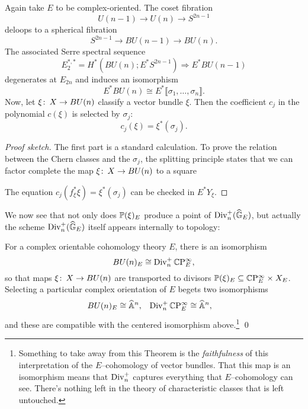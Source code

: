 \begin{theorem}
Again take $E$ to be complex-oriented.  The coset fibration \[U(n-1) \to U(n) \to S^{2n-1}\] deloops to a spherical fibration \[S^{2n-1} \to BU(n-1) \to BU(n).\]  The associated Serre spectral sequence \[E_2^{*, *} = H^*(BU(n); E^* S^{2n-1}) \Rightarrow E^* BU(n-1)\] degenerates at $E_{2n}$ and induces an isomorphism \[E^* BU(n) \cong E^* \llbracket \sigma_1, \ldots, \sigma_n\rrbracket.\]  Now, let $\xi\co X \to BU(n)$ classify a vector bundle $\xi$.  Then the coefficient $c_j$ in the polynomial $c(\xi)$ is selected by $\sigma_j$: \[c_j(\xi) = \xi^*(\sigma_j).\]
\end{theorem}
\begin{proof}[Proof sketch]
The first part is a standard calculation.  To prove the relation between the Chern classes and the $\sigma_j$, the splitting principle states that we can factor complete the map $\xi\co X \to BU(n)$ to a square
\begin{center}
\end{center}
The equation $c_j(f_\xi^* \xi) = \xi^*(\sigma_j)$ can be checked in $E^* Y_\xi$.
\end{proof}

We now see that not only does $\P(\xi)_E$ produce a point of $\Div_n^+(\G_E)$, but actually the scheme $\Div_n^+(\G_E)$ itself appears internally to topology:

\begin{corollary}\label{IdentificationOfBUnWithDivn}
For a complex orientable cohomology theory $E$, there is an isomorphism \[BU(n)_E \cong \Div_n^+ \CP^\infty_E,\] so that maps $\xi\co X \to BU(n)$ are transported to divisors $\P(\xi)_E \subseteq \CP^\infty_E \times X_E$.  Selecting a particular complex orientation of $E$ begets two isomorphisms
\begin{align*}
BU(n)_E & \cong \A^n, &
\Div_n^+ \CP^\infty_E & \cong \A^n,
\end{align*}
and these are compatible with the centered isomorphism above.\footnote{Something to take away from this Theorem is the \emph{faithfulness} of this interpretation of the $E$--cohomology of vector bundles.  That this map is an isomorphism means that $\Div_n^+$ captures everything that $E$--cohomology can see.  There's nothing left in the theory of characteristic classes that is left untouched.} \qed
\end{corollary}

